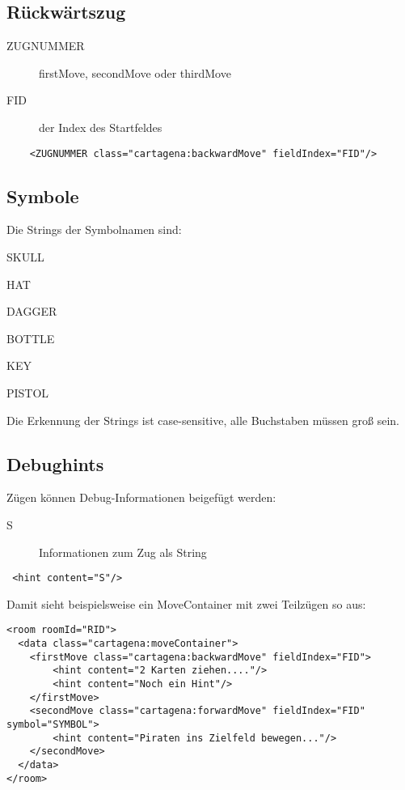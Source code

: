 \documentclass[12pt,a4paper, ngerman, oneside]{scrartcl}
\begin{document}
\subsection{Rückwärtszug}
\label{backwardMove}
\begin{description}
\item[ZUGNUMMER] firstMove, secondMove oder thirdMove
\item[FID] der Index des Startfeldes
\end{description}
\begin{verbatim}
	<ZUGNUMMER class="cartagena:backwardMove" fieldIndex="FID"/>
\end{verbatim}


\subsection{\label{symbols}Symbole}

Die Strings der Symbolnamen sind:
\begin{compactenum}
\item SKULL
\item HAT
\item DAGGER
\item BOTTLE
\item KEY
\item PISTOL
\end{compactenum}
Die Erkennung der Strings ist case-sensitive, alle Buchstaben müssen groß
sein.
\subsection{Debughints}
Zügen können Debug-Informationen beigefügt werden:
\begin{description}
\item[S] Informationen zum Zug als String
\end{description}
\begin{verbatim}
 <hint content="S"/>
\end{verbatim}
Damit sieht beispielsweise ein MoveContainer mit zwei Teilzügen so aus:
\begin{verbatim}
<room roomId="RID">
  <data class="cartagena:moveContainer">
    <firstMove class="cartagena:backwardMove" fieldIndex="FID">
     	<hint content="2 Karten ziehen...."/>
     	<hint content="Noch ein Hint"/>
    </firstMove>
    <secondMove class="cartagena:forwardMove" fieldIndex="FID" symbol="SYMBOL">
    	<hint content="Piraten ins Zielfeld bewegen..."/>
    </secondMove>
  </data>
</room>
\end{verbatim}
\end{document}
